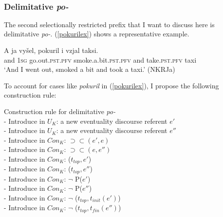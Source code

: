 \documentclass[output=paper,colorlinks,citecolor=brown]{langscibook}
\begin{document}
\begin{figure}
\caption{\label{radek}possible scenarios for (\ref{boxzaplak})}
\begin{subfigure}[b]{.12\linewidth}
\centering
{}
\caption{}
\label{rada}
\end{subfigure}$\quad\quad\quad\quad$
\begin{subfigure}[b]{.2\linewidth}
\centering
{}
\caption{}
\label{radb}
\end{subfigure}
\end{figure}

\subsubsection{Delimitative \textit{po-}}\label{zapopo}
The second selectionally restricted prefix that I want to discuss here is delimitative \textit{po-}.
(\ref{pokurilex}) shows a representative example. 

\ea\label{pokurilex}
\gll A ja vyšel, pokuril i vzjal
taksi. \\
and \textsc{1sg} go.out.\textsc{pst.pfv} smoke.a.bit.\textsc{pst.pfv} 
and take.\textsc{pst.pfv} taxi \\
\glt `And I went out, smoked a bit and took a taxi.' \hfill (NKRJa)
\z

\noindent To account for cases like \textit{pokuril} in (\ref{pokurilex}), 
I propose the following construction rule:

\ea\label{CRpo} Construction rule for delimitative \textit{po-} \\
- Introduce in $U_K$: a new eventuality discourse referent $e'$\\
- Introduce in $U_K$: a new eventuality discourse referent $e''$\\
- Introduce in $Con_K$: $\supset\subset (e',e)$\\
- Introduce in $Con_K$: $\supset\subset (e,e'')$\\
- Introduce in $Con_K$: ($t_{top},e'$)\\
- Introduce in $Con_K$: ($t_{top},e''$)\\
- Introduce in $Con_K$: $\neg$ P($e'$)\\
- Introduce in $Con_K$: $\neg$ P($e''$)\\
- Introduce in $Con_K$: $\neg$ ($t_{top},t_{init}(e')$)\\
- Introduce in $Con_K$: $\neg$ ($t_{top},t_{fin}(e'')$)\\
\z
\end{document}
